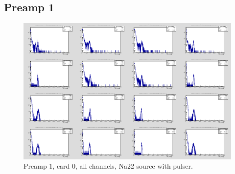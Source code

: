 \documentclass{report}
\begin{document}
\subsection{Preamp 1}
\begin{figure}[!htb]
  \includegraphics[width=\linewidth]{preamp1_lim_energy_card0_all.png}
  \caption{Preamp 1, card 0, all channels, Na22 source  with pulser.}
\end{figure}
\end{document}
